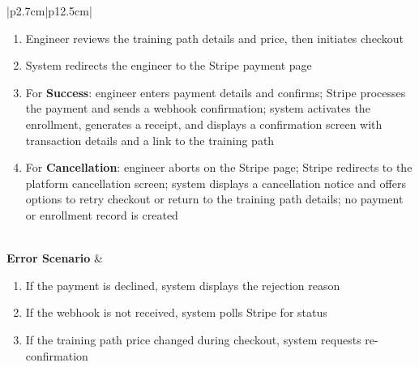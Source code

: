 \begin{table}[H]
\begin{tabular}{|p{2.7cm}|p{12.5cm}|}
\begin{minipage}[t]{\linewidth}
                                           \begin{enumerate}[topsep=0pt,itemsep=1pt,parsep=0pt,partopsep=0pt]
                                               \item Engineer reviews the training path details and price, then initiates checkout
                                               \item System redirects the engineer to the Stripe payment page
                                               \item For \textbf{Success}: engineer enters payment details and confirms; Stripe
                                                     processes the payment and sends a webhook confirmation; system activates the
                                                     enrollment, generates a receipt, and displays a confirmation screen with
                                                     transaction details and a link to the training path
                                               \item For \textbf{Cancellation}: engineer aborts on the Stripe page; Stripe redirects
                                                     to the platform cancellation screen; system displays a cancellation notice and
                                                     offers options to retry checkout or return to the training path details; no
                                                     payment or enrollment record is created
                                           \end{enumerate}
                                       \end{minipage}                                                      \\
            \hline
            \textbf{Error Scenario}  & \begin{minipage}[t]{\linewidth}
                                           \begin{enumerate}[topsep=0pt,itemsep=1pt,parsep=0pt,partopsep=0pt]
                                               \item If the payment is declined, system displays the rejection reason
                                               \item If the webhook is not received, system polls Stripe for status
                                               \item If the training path price changed during checkout, system requests
                                                     re-confirmation

\end{enumerate}
\end{minipage}
\end{tabular}
\end{table}
